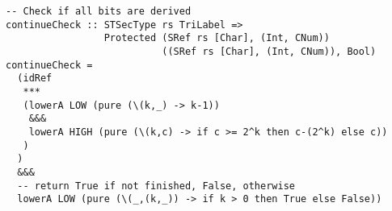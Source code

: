 \begin{Verbatim}[fontsize=\footnotesize,frame=lines,
                 framesep=5mm, label={[Shopping.hs]Shopping.hs}]
-- Check if all bits are derived
continueCheck :: STSecType rs TriLabel =>
                 Protected (SRef rs [Char], (Int, CNum)) 
                           ((SRef rs [Char], (Int, CNum)), Bool)
continueCheck =
  (idRef 
   ***
   (lowerA LOW (pure (\(k,_) -> k-1))  
    &&&
    lowerA HIGH (pure (\(k,c) -> if c >= 2^k then c-(2^k) else c)) 
   )
  )
  &&&
  -- return True if not finished, False, otherwise
  lowerA LOW (pure (\(_,(k,_)) -> if k > 0 then True else False))
\end{Verbatim}
